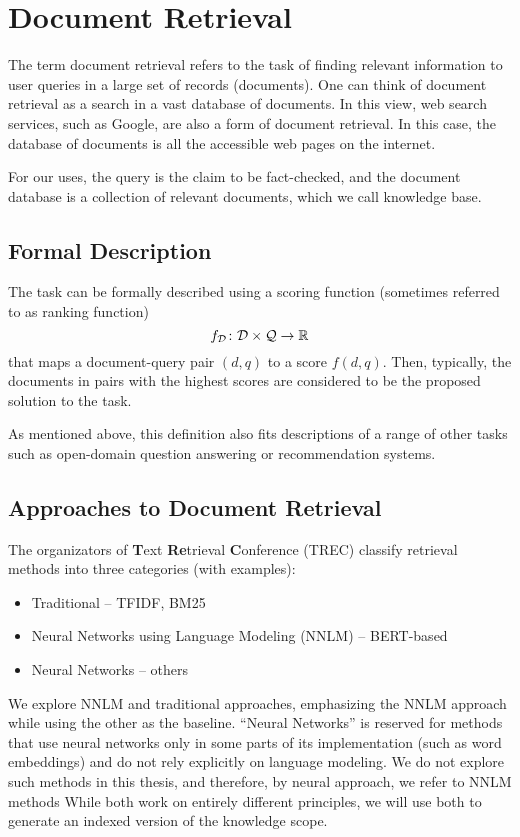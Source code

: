 \chapter{Document Retrieval}
\label{chap:docret}

The term document retrieval refers to the task of finding relevant information to user queries in a large set of records (documents). 
One can think of document retrieval as a search in a vast database of documents. 
In this view, web search services, such as Google, are also a form of document retrieval. 
In this case, the database of documents is all the accessible web pages on the internet.

For our uses, the query is the claim to be fact-checked, and the document database is a collection of relevant documents, which we call knowledge base. 

\section{Formal Description}
\label{sec:formal_descr_dr}
The task can be formally described \citep{two-tower} using a scoring function (sometimes referred to as ranking function) %
$$f_\mathcal{D}\colon\mathcal{D}\times\mathcal{Q}\rightarrow\mathbb{R}$$
that maps a document-query pair $(d, q)$ to a score $f(d,q)$. 
Then, typically, the documents in pairs with the highest scores are considered to be the proposed solution to the task. 

As mentioned above, this definition also fits descriptions of a range of other tasks such as open-domain question answering \citep{wiki-retrieval} or recommendation systems.

\section{Approaches to Document Retrieval}

The organizators of \textbf{T}ext \textbf{Re}trieval \textbf{C}onference (TREC) \citep{trec-2020} classify retrieval methods into three categories (with examples):
\begin{itemize}
        \item Traditional -- TFIDF, BM25
        \item Neural Networks using Language Modeling (NNLM) -- BERT-based
        \item Neural Networks -- others
\end{itemize}
We explore NNLM and traditional approaches, emphasizing the NNLM approach while using the other as the baseline. ``Neural Networks'' is reserved for methods that use neural networks only in some parts of its implementation (such as word embeddings) and do not rely explicitly on language modeling. We do not explore such methods in this thesis, and therefore, by neural approach, we refer to NNLM methods
While both work on entirely different principles, we will use both to generate an indexed version of the knowledge scope.

